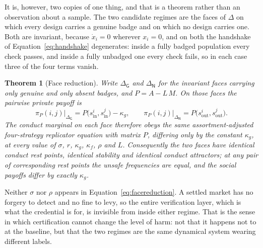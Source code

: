 \documentclass[preprint,12pt]{elsarticle}
\theoremstyle{plain}
\newtheorem{theorem}{Theorem}
\theoremstyle{definition}
\newcommand{\piP}{\pi_{P}}
\begin{document}
It is, however, two copies of one thing, and that is a theorem rather than an
observation about a sample. The two candidate regimes are the faces of $\Delta$
on which every design carries a genuine badge and on which no design carries
one. Both are invariant, because $\dot{x}_i = 0$ wherever $x_i = 0$, and on
both the handshake of Equation~\eqref{eq:handshake} degenerates: inside a fully
badged population every check passes, and inside a fully unbadged one every
check fails, so in each case three of the four terms vanish.

\begin{theorem}[Face reduction]
\label{thm:face}
Write $\Delta_{\mathsf{G}}$ and $\Delta_{\mathsf{N}}$ for the invariant faces
carrying only genuine and only absent badges, and $P = A - L\,M$. On those
faces the pairwise private payoff is
\begin{equation}
\label{eq:facereduction}
\piP(i,j)\big|_{\Delta_{\mathsf{G}}}
  = P\big(s^{i}_{\mathrm{in}}, s^{j}_{\mathrm{in}}\big) - \kappa_g,
\qquad
\piP(i,j)\big|_{\Delta_{\mathsf{N}}}
  = P\big(s^{i}_{\mathrm{out}}, s^{j}_{\mathrm{out}}\big).
\end{equation}
The conduct marginal on each face therefore obeys the \emph{same}
assortment-adjusted four-strategy replicator equation with matrix $P$,
differing only by the constant $\kappa_g$, at every value of $\sigma$, $r$,
$\kappa_g$, $\kappa_f$, $\rho$ and $L$. Consequently the two faces have
identical conduct rest points, identical stability and identical conduct
attractors; at any pair of corresponding rest points the unsafe frequencies are
equal, and the social payoffs differ by exactly $\kappa_g$.
\end{theorem}

Neither $\sigma$ nor $\rho$ appears in Equation~\eqref{eq:facereduction}. A
settled market has no forgery to detect and no fine to levy, so the entire
verification layer, which is what the credential is for, is invisible from
inside either regime. That is the sense in which certification cannot change
the level of harm: not that it happens not to at the baseline, but that the two
regimes are the same dynamical system wearing different labels.
\end{document}
